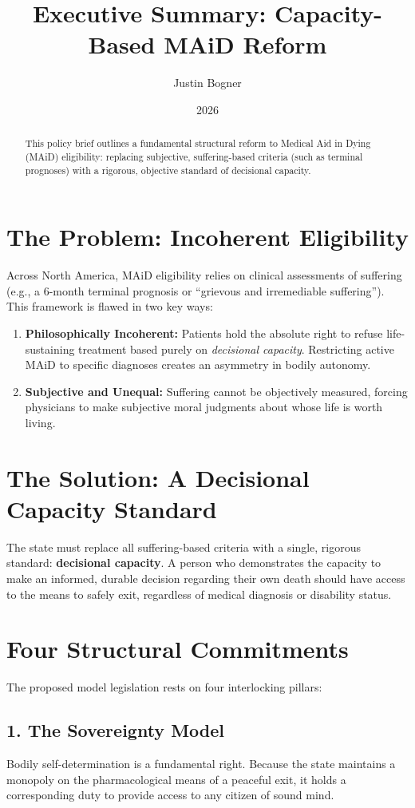 \documentclass[11pt]{article}
\title{Executive Summary: Capacity-Based MAiD Reform}
\author{Justin Bogner}
\date{2026}
\begin{document}
\maketitle

\begin{abstract}
\noindent This policy brief outlines a fundamental structural reform to Medical Aid in Dying (MAiD) eligibility: replacing subjective, suffering-based criteria (such as terminal prognoses) with a rigorous, objective standard of decisional capacity. 
\end{abstract}

\section*{The Problem: Incoherent Eligibility}
Across North America, MAiD eligibility relies on clinical assessments of suffering (e.g., a 6-month terminal prognosis or ``grievous and irremediable suffering''). This framework is flawed in two key ways:
\begin{enumerate}
    \item \textbf{Philosophically Incoherent:} Patients hold the absolute right to refuse life-sustaining treatment based purely on \textit{decisional capacity}. Restricting active MAiD to specific diagnoses creates an asymmetry in bodily autonomy.
    \item \textbf{Subjective and Unequal:} Suffering cannot be objectively measured, forcing physicians to make subjective moral judgments about whose life is worth living.
\end{enumerate}

\section*{The Solution: A Decisional Capacity Standard}
The state must replace all suffering-based criteria with a single, rigorous standard: \textbf{decisional capacity}. A person who demonstrates the capacity to make an informed, durable decision regarding their own death should have access to the means to safely exit, regardless of medical diagnosis or disability status.

\section*{Four Structural Commitments}
The proposed model legislation rests on four interlocking pillars:

\subsection*{1. The Sovereignty Model}
Bodily self-determination is a fundamental right. Because the state maintains a monopoly on the pharmacological means of a peaceful exit, it holds a corresponding duty to provide access to any citizen of sound mind.
\end{document}
